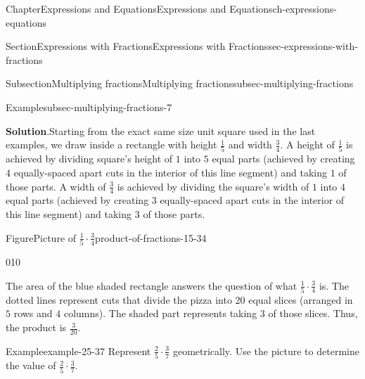 \documentclass[twoside,11pt,]{book}
\newcommand{\blocktitlefont}{\relax}
\numberwithin{equation}{chapter}
\begin{document}
\begin{chapterptx}{Chapter}{Expressions and Equations}{}{Expressions and Equations}{}{}{ch-expressions-equations}
\begin{sectionptx}{Section}{Expressions with Fractions}{}{Expressions with Fractions}{}{}{sec-expressions-with-fractions}
\begin{subsectionptx}{Subsection}{Multiplying fractions}{}{Multiplying fractions}{}{}{subsec-multiplying-fractions}
\begin{example}{Example}{}{subsec-multiplying-fractions-7}
\par\smallskip%
\noindent\textbf{\blocktitlefont Solution}.\hypertarget{subsec-multiplying-fractions-7-2}{}\quad{}Starting from the exact same size unit square used in the last examples, we draw inside a rectangle with height \(\frac15\) and width \(\frac34\). A height of \(\frac15\) is achieved by dividing square's height of \(1\) into \(5\) equal parts (achieved by creating \(4\) equally-spaced apart cuts in the interior of this line segment) and taking \(1\) of those parts. A width of \(\frac34\) is achieved by dividing the square's width of \(1\) into \(4\) equal parts (achieved by creating \(3\) equally-spaced apart cuts in the interior of this line segment) and taking \(3\) of those parts. \begin{figureptx}{Figure}{Picture of \(\frac15 \cdot \frac34\)}{product-of-fractions-15-34}{}%
\begin{image}{0}{1}{0}{}%
%
\end{image}%
\tcblower
\end{figureptx}%
 The area of the blue shaded rectangle answers the question of what \(\frac15 \cdot \frac34\) is. The dotted lines represent cuts that divide the pizza into \(20\) equal slices (arranged in \(5\) rows and \(4\) columns). The shaded part represents taking \(3\) of those slices. Thus, the product is \(\frac{3}{20}\).%
\end{example}
\begin{example}{Example}{}{example-25-37}%
Represent \(\frac25 \cdot \frac37\) geometrically. Use the picture to determine the value of \(\frac25 \cdot \frac37\).%

\end{example}
\end{subsectionptx}
\end{sectionptx}
\end{chapterptx}
\end{document}
